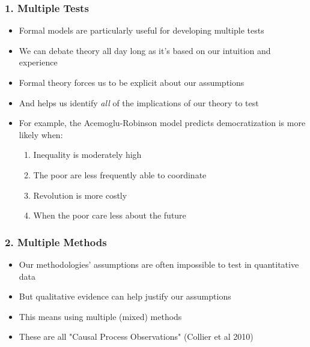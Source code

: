 \documentclass[xcolor=x11names,compress]{beamer}\usepackage[]{graphicx}\usepackage[]{color}
\renewcommand{\(}{\begin{columns}}
\renewcommand{\)}{\end{columns}}
\newcommand{\<}[1]{\begin{column}{#1}}
\renewcommand{\>}{\end{column}}
\begin{document}
\begin{frame}
\frametitle{1. Multiple Tests}
\begin{itemize}
\item Formal models are particularly useful for developing multiple tests
\pause
\item We can debate theory all day long as it's based on our intuition and experience
\pause
\item Formal theory forces us to be explicit about our assumptions
\pause
\item And helps us identify \textit{all} of the implications of our theory to test
\pause
\item For example, the Acemoglu-Robinson model predicts democratization is more likely when:
\begin{enumerate}
\item Inequality is moderately high
\pause
\item The poor are less frequently able to coordinate
\pause
\item Revolution is more costly
\pause
\item When the poor care less about the future
\end{enumerate}
\end{itemize}
\end{frame}

\begin{frame}
\frametitle{2. Multiple Methods}
\begin{itemize}
\item Our methodologies' assumptions are often impossible to test in quantitative data
\pause
\item But qualitative evidence can help justify our assumptions
\pause
\item This means using multiple (mixed) methods
\pause
\item These are all "Causal Process Observations" (Collier et al 2010)
\end{itemize}
\end{frame}
\end{document}
